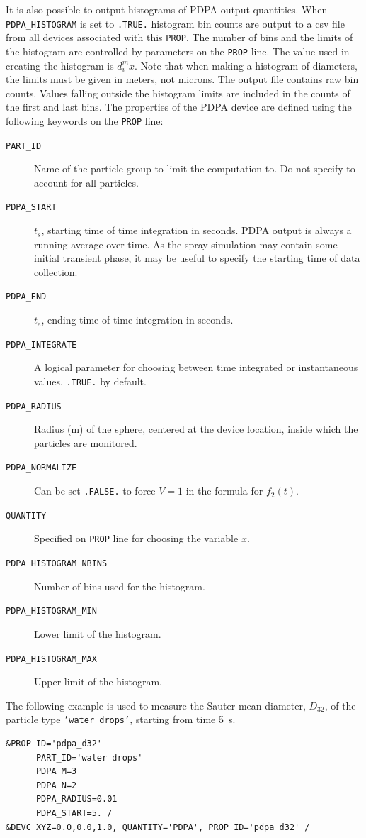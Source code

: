 \documentclass[11pt]{book}
\newcommand{\ct}{\tt\small}
\begin{document}
It is also possible to output histograms of PDPA output quantities. When {\ct PDPA\_HISTOGRAM} is set to {\ct .TRUE.} histogram bin counts are output to  a csv file from all devices associated with this {\ct PROP}. The number of bins and the limits of the histogram are controlled by parameters on the {\ct PROP} line. The value used in creating the histogram is $d_i^m x$. Note that when making a histogram of diameters, the limits must be given in meters, not microns.  The output file contains raw bin counts. Values falling outside the histogram limits are included in the counts of the first and last bins.
The properties of the PDPA device are defined using the following keywords on the {\ct PROP} line:
\begin{description}
\item[{\ct PART\_ID}] Name of the particle group to limit the computation to. Do not specify to account for all particles.
\item[{\ct PDPA\_START}] $t_s$, starting time of time integration in seconds. PDPA output is always a running average over time.
As the spray simulation may contain some initial transient phase, it may be useful to specify the starting time of data collection.
\item[{\ct PDPA\_END}] $t_e$, ending time of time integration in seconds.
\item[{\ct PDPA\_INTEGRATE}] A logical parameter for choosing between time integrated or instantaneous values. {\ct .TRUE.} by default.
\item[{\ct PDPA\_RADIUS}] Radius (m) of the sphere, centered at the device location, inside which the particles are monitored.
\item[{\ct PDPA\_NORMALIZE}] Can be set {\ct .FALSE.} to force $V = 1$ in the formula for $f_2(t)$.
\item[{\ct QUANTITY}] Specified on {\ct PROP} line for choosing the variable $x$.
\item[{\ct PDPA\_HISTOGRAM\_NBINS}] Number of bins used for the histogram.
\item[{\ct PDPA\_HISTOGRAM\_MIN}] Lower limit of the histogram.
\item[{\ct PDPA\_HISTOGRAM\_MAX}] Upper limit of the histogram.
\end{description}

\noindent The following example is used to measure the Sauter mean diameter, $D_{32}$, of the particle type {\ct 'water drops'}, starting from
time 5~s.
\footnotesize
\begin{verbatim}
&PROP ID='pdpa_d32'
      PART_ID='water drops'
      PDPA_M=3
      PDPA_N=2
      PDPA_RADIUS=0.01
      PDPA_START=5. /
&DEVC XYZ=0.0,0.0,1.0, QUANTITY='PDPA', PROP_ID='pdpa_d32' /
\end{verbatim}
\normalsize
\end{document}
